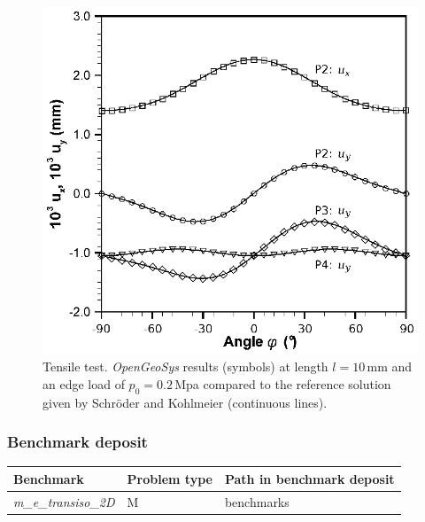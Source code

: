 \begin{figure}[!htb]
\begin{center}
\includegraphics[scale=0.7]{M/figure/tenstest_results_OGS.eps}
\end{center}
\caption{Tensile test. {\sl OpenGeoSys} results (symbols) at length $l=10\,$mm and an edge load of $p_0=0.2\,$Mpa compared to the reference solution given by Schr\"oder \cite{Schroeder:1996} and Kohlmeier \cite{Kohlmeier:2006} (continuous lines).}
\label{tens_transiso_test_2d}
\end{figure}

\subsubsection*{Benchmark deposit}

\begin{tabular}{|l|l|l|}
  \hline
  Benchmark & Problem type & Path in benchmark deposit \\
  \hline
 \emph{m\_e\_transiso\_2D} & M & benchmarks\verb \M\ \\
  \hline
\end{tabular}

